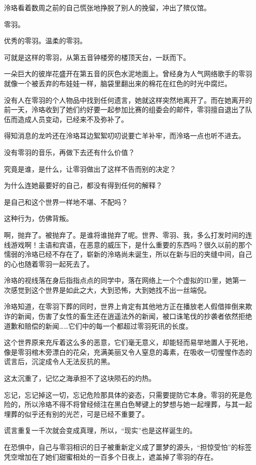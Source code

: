 \documentclass[UTF8, scheme = chinese, openany]{ctexbook}
\begin{document}
泠珞看着数周之前的自己慌张地挣脱了别人的挽留，冲出了殡仪馆。

零羽。

优秀的零羽。温柔的零羽。

可就是这样的零羽，从第五音钟楼旁的楼顶天台，一跃而下。

一朵巨大的彼岸花盛开在第五音的灰色水泥地面上。曾经身为人气网络歌手的零羽就像一个被丢弃的布娃娃一样，脑袋里翻出来的棉花在红色的时光中腐烂。

没有人在零羽的个人物品中找到任何遗言，她就这样突然地离开了。而在她离开的前一天，泠珞收到了她们约好要一起参加比赛的组委会的邮件，零羽擅自退出了队伍而造成人员变动，已经来不及弥补了。

得知消息的龙吟还在泠珞耳边絮絮叨叨说要亡羊补牢，而泠珞一点也听不进去。

没有零羽的音乐，再做下去还有什么价值？

究竟是谁，是什么，让零羽做出了这样不告而别的决定？

为什么连她最要好的自己，都没有得到任何的解释？

是自己和这个世界一样地不堪、不配吗？

这种行为，仿佛背叛。

啊，抛弃了。被抛弃了。是谁将谁抛弃了呢。世界、零羽、我，多么打发时间的连线游戏啊！主语和宾语，在恶意的威压下，是什么重要的东西吗？很久以前的那个懦弱的泠珞已经不存在了，崭新的泠珞尚未诞生，所以在新与旧的夹缝中间，自己的心也随着零羽一起死去了。

泠珞的视线落在身后指指点点的同学中，落在网络上一个个虚拟的ID里，她第一次感觉到这个世界是如此之大，大到恐怖，大到她找不出一丝端倪。

泠珞知道，在零羽下葬的同时，世界上肯定有其他地方正在播放老人假借摔倒来欺诈的新闻，伤害了女性的畜生还在逍遥法外的新闻，被口诛笔伐的抄袭者依然拒绝道歉和赔偿的新闻……它们中的每一个都超过零羽死讯的长度。

这个世界原来充斥着这么多的恶意，它们毫无意义，却能轻而易举地置人于死地，像是零羽棺木旁漂白的花朵，充满美丽又令人窒息的毒素，在吸收一切惺惺作态的谎言后，沉淀成令人无法反抗的黑。

这太沉重了，记忆之海承担不了这块陨石的灼热。

忘记，忘记掉这一切，忘记危险那具体的姿态，只需要提防它本身。零羽的死是危险的，所以泠珞不得不将曾经倾注在黑白色琴键上的梦想与她一起埋葬，与其一起埋葬的似乎还有别的光芒，可是已经不重要了。

谎言重复一千次就会变成真理，所以，“现实”也是这样诞生的。

在恐惧中，自己与零羽相识的日子被重新定义成了噩梦的源头，“担惊受怕”的标签凭空增加在了她们甜蜜相处的一百多个日夜上，遮盖掉了零羽的存在。
\end{document}
